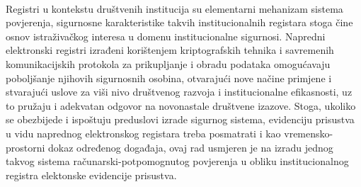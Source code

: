 \paragraph*{}
Registri u kontekstu društvenih institucija su elementarni mehanizam sistema povjerenja, sigurnosne karakteristike takvih institucionalnih registara stoga čine osnov istraživačkog interesa u domenu institucionalne sigurnosi. Napredni elektronski registri izrađeni korištenjem kriptografskih tehnika i savremenih komunikacijskih protokola za prikupljanje i obradu podataka omogućavaju poboljšanje njihovih sigurnosnih osobina, otvarajući nove načine primjene i stvarajući uslove za viši nivo društvenog razvoja i institucionalne efikasnosti, uz to pružaju i adekvatan odgovor na novonastale društvene izazove. Stoga, ukoliko se obezbijede i ispoštuju preduslovi izrade sigurnog sistema\cite{iso2013iso}, evidenciju prisustva u vidu naprednog elektronskog registara treba posmatrati i kao vremensko-prostorni dokaz određenog događaja, ovaj rad usmjeren je na izradu jednog takvog sistema računarski-potpomognutog povjerenja u obliku institucionalnog registra elektonske evidencije prisustva.